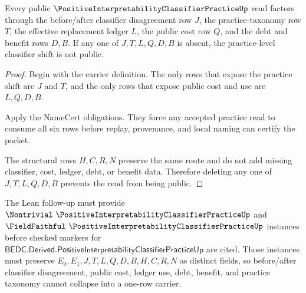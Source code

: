\begin{theorem}
\label{thm:positive-interpretability-classifier-practice-public-cost-ledger-nonescape}
Every public $\PositiveInterpretabilityClassifierPracticeUp$ read factors through the before/after classifier disagreement row $J$, the practice-taxonomy row $T$, the effective replacement ledger $L$, the public cost row $Q$, and the debt and benefit rows $D,B$. If any one of $J,T,L,Q,D,B$ is absent, the practice-level classifier shift is not public.
\end{theorem}
\begin{proof}
Begin with the carrier definition. The only rows that expose the practice shift are $J$ and $T$, and the only rows that expose public cost and use are $L,Q,D,B$.

Apply the NameCert obligations. They force any accepted practice read to consume all six rows before replay, provenance, and local naming can certify the packet.

The structural rows $H,C,R,N$ preserve the same route and do not add missing classifier, cost, ledger, debt, or benefit data. Therefore deleting any one of $J,T,L,Q,D,B$ prevents the read from being public.
\end{proof}



The Lean follow-up must provide $\Nontrivial\ \PositiveInterpretabilityClassifierPracticeUp$ and $\FieldFaithful\ \PositiveInterpretabilityClassifierPracticeUp$ instances before checked markers for $\mathsf{BEDC.Derived.PositiveInterpretabilityClassifierPracticeUp}$ are cited. Those instances must preserve $E_0,E_1,J,T,L,Q,D,B,H,C,R,N$ as distinct fields, so before/after classifier disagreement, public cost, ledger use, debt, benefit, and practice taxonomy cannot collapse into a one-row carrier.

